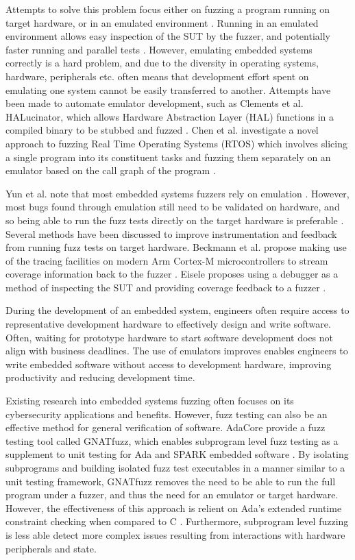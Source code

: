 \documentclass[../report.tex]{subfiles}
\begin{document}
Attempts to solve this problem focus either on fuzzing a program running on
target hardware, or in an emulated environment \citep{Eisele_et_al_2022}.
Running in an emulated environment allows easy inspection of the SUT by the
fuzzer, and potentially faster running and parallel tests
\citep{Eisele_et_al_2022}. However, emulating embedded systems correctly is a
hard problem, and due to the diversity in operating systems, hardware,
peripherals etc. often means that development effort spent on emulating one
system cannot be easily transferred to another. Attempts have been made to
automate emulator development, such as Clements et al. HALucinator, which
allows Hardware Abstraction Layer (HAL) functions in a compiled binary to be
stubbed and fuzzed \citep{Clements_2021}.
Chen et al. investigate a novel approach to fuzzing Real Time Operating Systems
(RTOS) which involves slicing a single program into its constituent tasks and
fuzzing them separately on an emulator based on the call graph of the program
\citep{Chen_2022}.

Yun et al. note that most embedded systems fuzzers rely on emulation
\citep{Yun_2022}. However, most bugs found through emulation still need to be
validated on hardware, and so being able to run the fuzz tests directly on the
target hardware is preferable \citep{Eisele_et_al_2022}. Several methods have
been discussed to improve instrumentation and feedback from running fuzz tests
on target hardware. Beckmann et al. propose making use of the tracing
facilities on modern Arm Cortex-M microcontrollers to stream coverage
information back to the fuzzer \citep{Beckmann_2023}. Eisele proposes using a
debugger as a method of inspecting the SUT and providing coverage feedback to a
fuzzer \citep{Eisele_2022}.

During the development of an embedded system, engineers often require access to
representative development hardware to effectively design and write software.
Often, waiting for prototype hardware to start software development does not
align with business deadlines. The use of emulators improves enables engineers
to write embedded software without access to development hardware, improving
productivity and reducing development time.

Existing research into embedded systems fuzzing often focuses on its
cybersecurity applications and benefits. However, fuzz testing can also be an
effective method for general verification of software. AdaCore provide a fuzz
testing tool called GNATfuzz, which enables subprogram level fuzz testing as a
supplement to unit testing for Ada and SPARK embedded software
\citep{gnatfuzz}. By isolating subprograms and building isolated fuzz test
executables in a manner similar to a unit testing framework, GNATfuzz removes
the need to be able to run the full program under a fuzzer, and thus the need
for an emulator or target hardware. However, the effectiveness of this approach
is relient on Ada's extended runtime constraint checking when compared to C
\citep{gnatfuzz}. Furthermore, subprogram level fuzzing is less able detect
more complex issues resulting from interactions with hardware peripherals and
state.
\end{document}
